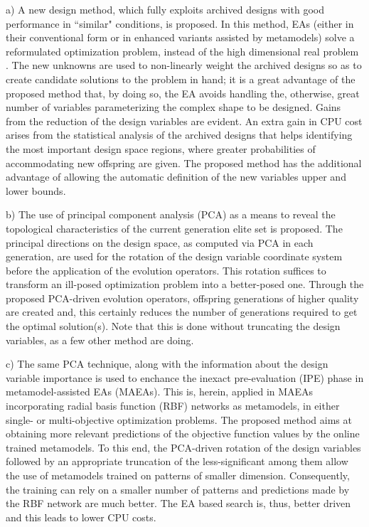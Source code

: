 \begin{abstractslong}
a)	 A new design method, which fully exploits archived designs with good performance in ``similar" conditions, is proposed. In this method, EAs (either in their conventional form or in enhanced variants assisted by metamodels) solve a reformulated optimization problem, instead of the high dimensional real problem . The new unknowns are used to non-linearly weight the archived designs so as to create candidate solutions to the problem in hand; it is a great advantage of the proposed method that, by doing so, the EA avoids handling the, otherwise, great number of variables parameterizing the complex shape to be designed. Gains from the reduction of the design variables are evident. An extra gain in CPU cost arises from the statistical analysis of the archived designs that helps identifying the most important design space regions, where greater probabilities of accommodating new offspring are given. The proposed method has the additional advantage of allowing the automatic definition of the new variables upper and lower bounds.
	            
b)	 The use of principal component analysis (PCA) as a means to reveal the topological characteristics of the current generation elite set is proposed. The principal directions on the design space, as computed via PCA in each generation, are used for the rotation of the design variable coordinate system before the application of the evolution operators. This rotation suffices to transform an ill-posed optimization problem into a better-posed one. Through the proposed PCA-driven evolution operators, offspring generations of higher quality are created and, this certainly reduces the number of generations required to get the optimal solution(s). Note that this is done without truncating the design variables, as a few other method are doing.           

c)	 The same PCA technique, along with the information about the design variable importance is used to enchance the inexact pre-evaluation (IPE) phase in metamodel-assisted EAs (MAEAs). This is, herein, applied in MAEAs incorporating radial basis function (RBF) networks as metamodels, in either single- or multi-objective optimization problems. The proposed method aims at obtaining more relevant predictions of the objective function values by the online trained metamodels. To this end, the PCA-driven rotation of the design variables followed by an appropriate truncation of the less-significant among them allow the use of metamodels trained on patterns of smaller dimension. Consequently, the training can rely on a smaller number of patterns and predictions made by the RBF network are much better. The EA based search is, thus, better driven and this leads to lower CPU costs.


\end{abstractslong}

